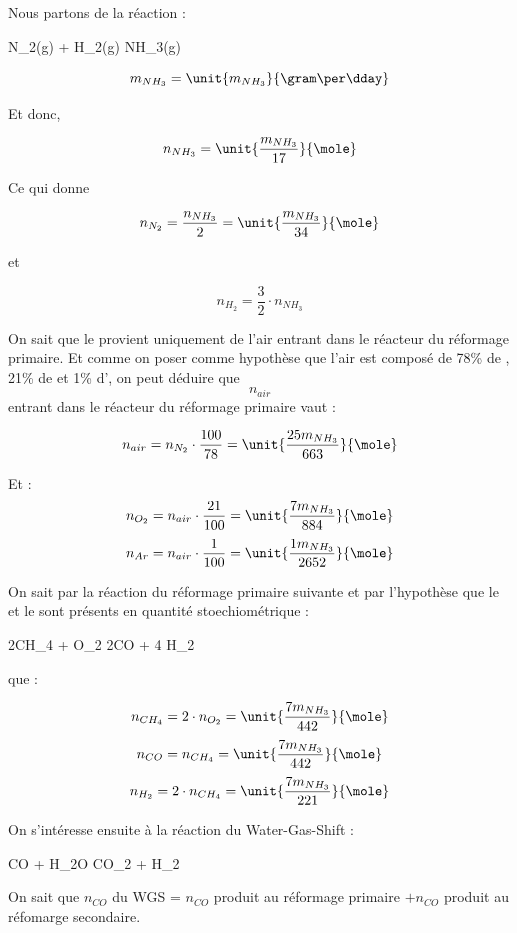 \documentclass{article}
\begin{document}
Nous partons de la réaction : 
\begin{chemmath}
		N_2(g) + H_2(g) \longrightarrow NH_3(g) 
\end{chemmath}
 	
$$m_{NH_3} = \unit{m_{NH_3}}{\gram\per\dday}$$ 

Et donc, 
 
$$n_{NH_3} = \unit{\frac{m_{NH_3}}{17}}{\mole}$$

Ce qui donne 

$$n_{N_2} = \frac{n_{NH_3}}{2} = \unit{\frac{m_{NH_3}}{34}}{\mole}$$ 

et 

$$n_{H_2} = \frac{3}{2} \cdot n_{NH_3}$$

On sait que le  provient uniquement de l'air entrant 
dans le réacteur du  réformage primaire. Et comme on poser comme hypothèse
que l'air est composé de 78\% de , 21\% de 
et 1\% d', on peut déduire que $$n_{air}$$ entrant dans le 
réacteur du réformage primaire vaut : 

$$n_{air}= n_{N_2} \cdot \frac{100}{78} = \unit{\frac{25m_{NH_3}}{663}}{\mole}$$ 

Et :
$$n_{O_2}= n_{air} \cdot \frac{21}{100} = \unit{\frac{7m_{NH_3}}{884}}{\mole}$$
$$n_{Ar}= n_{air} \cdot \frac{1}{100} = \unit{\frac{1m_{NH_3}}{2652}}{\mole}$$

On sait par la réaction du réformage primaire suivante et par l'hypothèse que le
 et le  sont présents en quantité stoechiométrique : 

\begin{chemmath}
	2CH_4 + O_2 \Longrightarrow 2CO + 4 H_2
\end{chemmath} 

que :

$$n_{CH_4} = 2 \cdot n_{O_2} = \unit{\frac{7m_{NH_3}}{442}}{\mole}$$
$$n_{CO} = n_{CH_4} =  \unit{\frac{7m_{NH_3}}{442}} {\mole}$$
$$n_{H_2} = 2 \cdot n_{CH_4} =  \unit{\frac{7m_{NH_3}}{221}}{\mole}$$

On s'intéresse ensuite à la réaction du Water-Gas-Shift : 

\begin{chemmath}
	CO + H_2O \Longrightarrow CO_2 + H_2
\end{chemmath} 

On sait que $n_{CO}$ du WGS = $n_{CO}$ produit au réformage primaire
$+ n_{CO}$ produit au réfomarge secondaire. 
\end{document}
